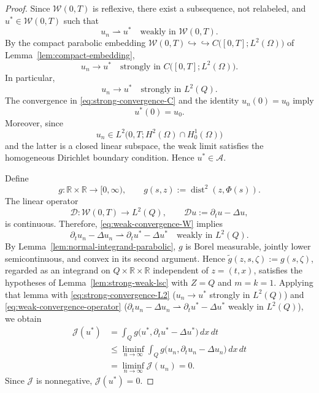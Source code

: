 \documentclass[11pt]{elsarticle}
\theoremstyle{definition}
\theoremstyle{remark}
\numberwithin{equation}{section}
\begin{document}
\begin{proof}
		Since $\mathcal{W}(0,T)$ is reflexive, there exist a subsequence,
		not relabeled, and $u^\ast\in\mathcal{W}(0,T)$ such that
		\begin{equation}
		u_n\rightharpoonup u^\ast
		\quad\text{weakly in }\mathcal{W}(0,T).
		\label{eq:weak-convergence-W}
		\end{equation}
		By the compact parabolic embedding	$\mathcal{W}(0,T)
		\hookrightarrow\hookrightarrow
		C\bigl([0,T];L^2(\Omega)\bigr)$ of
		Lemma~\ref{lem:compact-embedding},
		\begin{equation}
		u_n\longrightarrow u^\ast
		\quad\text{strongly in }
		C\bigl([0,T];L^2(\Omega)\bigr).
		\label{eq:strong-convergence-C}
		\end{equation}
		In particular,
		\begin{equation}
		u_n\longrightarrow u^\ast
		\quad\text{strongly in }L^2(Q).
		\label{eq:strong-convergence-L2}
		\end{equation}
		The convergence in \eqref{eq:strong-convergence-C} and the identity
		$u_n(0)=u_0$ imply
		\[
		u^\ast(0)=u_0.
		\]
		Moreover, since
		\[
		u_n\in L^2\bigl(0,T;H^2(\Omega)\cap H_0^1(\Omega)\bigr)
		\]
		and the latter is a closed linear subspace, the weak limit satisfies
		the homogeneous Dirichlet boundary condition. Hence
		$u^\ast\in\mathcal{A}$.
		
		Define
		\[
		g:\mathbb{R}\times\mathbb{R}\longrightarrow[0,\infty),
		\qquad
		g(s,z):=\operatorname{dist}^2(z,\Phi(s)).
		\]
		The linear operator
		\[
		\mathcal{D}:
		\mathcal{W}(0,T)\longrightarrow L^2(Q),
		\qquad
		\mathcal{D}u:=\partial_tu-\Delta u,
		\]
		is continuous. Therefore, \eqref{eq:weak-convergence-W} implies
		\begin{equation}
		\partial_tu_n-\Delta u_n
		\rightharpoonup
		\partial_tu^\ast-\Delta u^\ast
		\quad\text{weakly in }L^2(Q).
		\label{eq:weak-convergence-operator}
		\end{equation}
		By Lemma~\ref{lem:normal-integrand-parabolic}, $g$ is Borel
		measurable, jointly lower semicontinuous, and convex in its second
		argument. Hence $\widetilde g(z,s,\zeta):=g(s,\zeta)$, regarded as an
		integrand on $Q\times\mathbb{R}\times\mathbb{R}$ independent of
		$z=(t,x)$, satisfies the hypotheses of
		Lemma~\ref{lem:strong-weak-lsc} with $Z=Q$ and $m=k=1$. Applying
		that lemma with \eqref{eq:strong-convergence-L2}
		($u_n\to u^\ast$ strongly in $L^2(Q)$) and
		\eqref{eq:weak-convergence-operator}
		($\partial_t u_n-\Delta u_n\rightharpoonup
		\partial_t u^\ast-\Delta u^\ast$ weakly in $L^2(Q)$), we obtain
		\[
		\begin{aligned}
			\mathcal{J}(u^\ast)
			&=
			\int_Q
			g\bigl(
			u^\ast,
			\partial_tu^\ast-\Delta u^\ast
			\bigr)\,dx\,dt
			\\
			&\leq
			\liminf_{n\to\infty}
			\int_Q
			g\bigl(
			u_n,
			\partial_tu_n-\Delta u_n
			\bigr)\,dx\,dt
			\\
			&=
			\liminf_{n\to\infty}
			\mathcal{J}(u_n)
			=
			0.
		\end{aligned}
		\]
		Since $\mathcal{J}$ is nonnegative, $\mathcal{J}(u^\ast)=0$. 
		

\end{proof}
\end{document}
